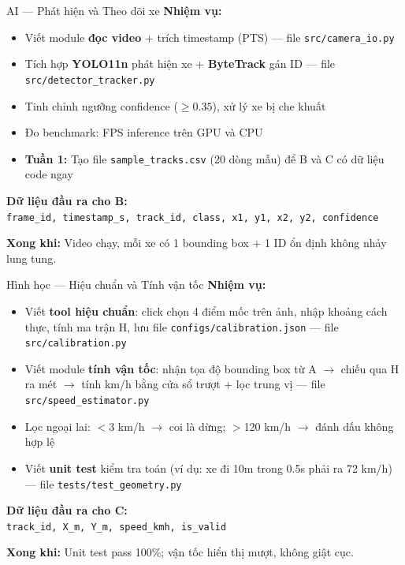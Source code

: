\documentclass[11pt,a4paper]{article}
\begin{document}
\begin{roleboxA}{AI --- Phát hiện và Theo dõi xe}
\textbf{Nhiệm vụ:}
\begin{itemize}
    \item Viết module \textbf{đọc video} + trích timestamp (PTS) --- file \texttt{src/camera\_io.py}
    \item Tích hợp \textbf{YOLO11n} phát hiện xe + \textbf{ByteTrack} gán ID --- file \texttt{src/detector\_tracker.py}
    \item Tinh chỉnh ngưỡng confidence ($\ge 0.35$), xử lý xe bị che khuất
    \item Đo benchmark: FPS inference trên GPU và CPU
    \item \textbf{Tuần 1:} Tạo file \texttt{sample\_tracks.csv} (20 dòng mẫu) để B và C có dữ liệu code ngay
\end{itemize}

\textbf{Dữ liệu đầu ra cho B:}\\
\small\texttt{frame\_id, timestamp\_s, track\_id, class, x1, y1, x2, y2, confidence}

\textbf{Xong khi:} Video chạy, mỗi xe có 1 bounding box + 1 ID ổn định không nhảy lung tung.
\end{roleboxA}

\vspace{0.3cm}

\begin{roleboxB}{Hình học --- Hiệu chuẩn và Tính vận tốc}
\textbf{Nhiệm vụ:}
\begin{itemize}
    \item Viết \textbf{tool hiệu chuẩn}: click chọn 4 điểm mốc trên ảnh, nhập khoảng cách thực, tính ma trận H, lưu file \texttt{configs/calibration.json} --- file \texttt{src/calibration.py}
    \item Viết module \textbf{tính vận tốc}: nhận tọa độ bounding box từ A $\rightarrow$ chiếu qua H ra mét $\rightarrow$ tính km/h bằng cửa sổ trượt + lọc trung vị --- file \texttt{src/speed\_estimator.py}
    \item Lọc ngoại lai: $<$3 km/h $\rightarrow$ coi là dừng; $>$120 km/h $\rightarrow$ đánh dấu không hợp lệ
    \item Viết \textbf{unit test} kiểm tra toán (ví dụ: xe đi 10m trong 0.5s phải ra 72 km/h) --- file \texttt{tests/test\_geometry.py}
\end{itemize}

\textbf{Dữ liệu đầu ra cho C:}\\
\small\texttt{track\_id, X\_m, Y\_m, speed\_kmh, is\_valid}

\textbf{Xong khi:} Unit test pass 100\%; vận tốc hiển thị mượt, không giật cục.
\end{roleboxB}
\end{document}
